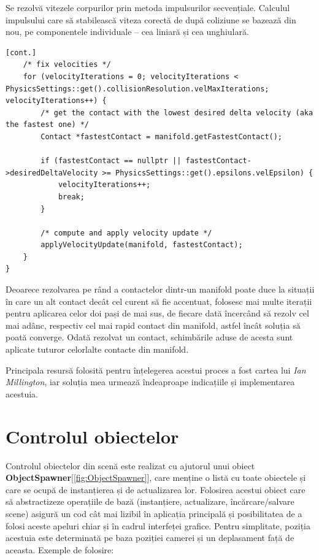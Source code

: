\documentclass[12pt,a4paper]{report}
\begin{document}
Se rezolvă vitezele corpurilor prin metoda impulsurilor secvențiale. Calculul impulsului care să stabilească viteza corectă de după coliziune se bazează din nou, pe componentele individuale -- cea liniară și cea unghiulară.
\begin{lstlisting}[style=myC++, label={code:solveManifold_c}]
[cont.]
	/* fix velocities */
	for (velocityIterations = 0; velocityIterations < PhysicsSettings::get().collisionResolution.velMaxIterations; velocityIterations++) {
		/* get the contact with the lowest desired delta velocity (aka the fastest one) */
		Contact *fastestContact = manifold.getFastestContact();

		if (fastestContact == nullptr || fastestContact->desiredDeltaVelocity >= PhysicsSettings::get().epsilons.velEpsilon) {
			velocityIterations++;
			break;
		}

		/* compute and apply velocity update */
		applyVelocityUpdate(manifold, fastestContact);
	}
}
\end{lstlisting}

Deoarece rezolvarea pe rând a contactelor dintr-un manifold poate duce la situații în care un alt contact decât cel curent să fie accentuat, folosesc mai multe iterații pentru aplicarea celor doi pași de mai sus, de fiecare dată încercând să rezolv cel mai adânc, respectiv cel mai rapid contact din manifold, astfel încât soluția să poată converge. Odată rezolvat un contact, schimbările aduse de acesta sunt aplicate tuturor celorlalte contacte din manifold.

Principala resursă folosită pentru înțelegerea acestui proces a fost cartea\cite{millington} lui \textit{Ian Millington}, iar soluția mea urmează îndeaproape indicațiile și implementarea acestuia.

\section {Controlul obiectelor}
Controlul obiectelor din scenă este realizat cu ajutorul unui obiect\textbf{ ObjectSpawner}[\autoref{fig:ObjectSpawner}], care menține o listă cu toate obiectele și care se ocupă de instanțierea și de actualizarea lor. Folosirea acestui obiect care să abstractizeze operațiile de bază (instanțiere, actualizare, încărcare/salvare scene) asigură un cod cât mai lizibil în aplicația principală și posibilitatea de a folosi aceste apeluri chiar și în cadrul interfeței grafice. Pentru simplitate, poziția acestuia este determinată pe baza poziției camerei și un deplasament față de aceasta. Exemple de folosire:
\end{document}
